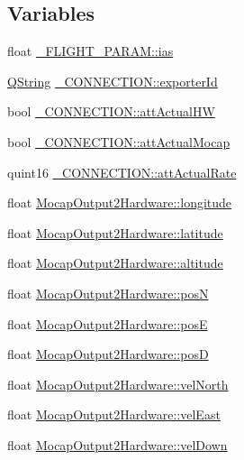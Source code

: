 \subsection*{\-Variables}
\begin{DoxyCompactItemize}
\item 
float \hyperlink{group___mo_cap_plugin_ga30e6260b59e9997c3b1bec5bc9347ec3}{\-\_\-\-F\-L\-I\-G\-H\-T\-\_\-\-P\-A\-R\-A\-M\-::ias}
\item 
\hyperlink{group___u_a_v_objects_plugin_gab9d252f49c333c94a72f97ce3105a32d}{\-Q\-String} \hyperlink{group___mo_cap_plugin_ga2bff4ba6b082ec966a7075df9e19d66b}{\-\_\-\-C\-O\-N\-N\-E\-C\-T\-I\-O\-N\-::exporter\-Id}
\item 
bool \hyperlink{group___mo_cap_plugin_ga4d9a7f3563731377f2905f1b18e17d52}{\-\_\-\-C\-O\-N\-N\-E\-C\-T\-I\-O\-N\-::att\-Actual\-H\-W}
\item 
bool \hyperlink{group___mo_cap_plugin_gacd70b3a85672be0f8311fc107768c93f}{\-\_\-\-C\-O\-N\-N\-E\-C\-T\-I\-O\-N\-::att\-Actual\-Mocap}
\item 
quint16 \hyperlink{group___mo_cap_plugin_ga14fb71ed2eb43b817ee157f6cdcb84eb}{\-\_\-\-C\-O\-N\-N\-E\-C\-T\-I\-O\-N\-::att\-Actual\-Rate}
\item 
float \hyperlink{group___mo_cap_plugin_ga65a9de4b87de2a4aaff0760f2b912407}{\-Mocap\-Output2\-Hardware\-::longitude}
\item 
float \hyperlink{group___mo_cap_plugin_gacfbf5cf513abfc200b4fd5c14dad294c}{\-Mocap\-Output2\-Hardware\-::latitude}
\item 
float \hyperlink{group___mo_cap_plugin_ga6f5725506a151cfd49e1c6b80c2e948f}{\-Mocap\-Output2\-Hardware\-::altitude}
\item 
float \hyperlink{group___mo_cap_plugin_ga75792a6a49b67e8d7b63a219ca0f2ed2}{\-Mocap\-Output2\-Hardware\-::pos\-N}
\item 
float \hyperlink{group___mo_cap_plugin_gaeb486e47d519b624cd7b598eb6f33169}{\-Mocap\-Output2\-Hardware\-::pos\-E}
\item 
float \hyperlink{group___mo_cap_plugin_ga60ef031584e000727250ea18e4e0ce36}{\-Mocap\-Output2\-Hardware\-::pos\-D}
\item 
float \hyperlink{group___mo_cap_plugin_gadfa715081f6bc74af7efc32c39d720f2}{\-Mocap\-Output2\-Hardware\-::vel\-North}
\item 
float \hyperlink{group___mo_cap_plugin_gaa2d1409fe871a4dd45265e2412d53f67}{\-Mocap\-Output2\-Hardware\-::vel\-East}
\item 
float \hyperlink{group___mo_cap_plugin_ga2ffad0e2c72a914bb6f9ff031aeb9b79}{\-Mocap\-Output2\-Hardware\-::vel\-Down}

\end{DoxyCompactItemize}
